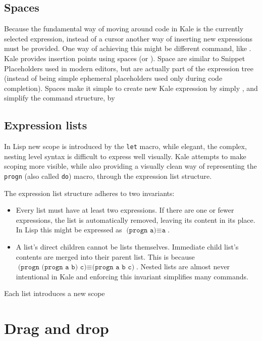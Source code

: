 \subsection{Spaces}
\label{expr:blank}
Because the fundamental way of moving around code in Kale is the currently
selected expression, instead of a cursor another way of inserting new
expressions must be provided. One way of achieving this might be different
 command, like . Kale
provides insertion points using spaces (or ).
Space are similar to Snippet Placeholders used in modern editors,
but are actually part of the expression tree (instead of being simple ephemeral
placeholders used only during code completion). Spaces make it simple to create
new Kale expression by simply , and simplify the
command structure, by 

\subsection{Expression lists}
\label{expr:list}
In Lisp new scope is introduced by the \texttt{let} macro, while elegant, the
complex, nesting level syntax is difficult to express well visually. Kale
attempts to make scoping more visible, while also providing a visually clean
way of representing the \texttt{progn} (also called \texttt{do}) macro,
through the expression list structure.

The expression list structure adheres to two invariants:
\begin{itemize}[noitemsep]
	\item Every list must have at least two expressions. If there are one or
	fewer expressions, the list is automatically removed, leaving its content
	in its place. In Lisp this might be expressed as
	$\texttt{(progn a)} \equiv \texttt{a}$.
	\item A list's direct children cannot be lists themselves. Immediate child
	list's contents are merged into their parent list. This is because
	$\texttt{(progn (progn a b) c)} \equiv \texttt{(progn a b c)}$.
	Nested lists are almost never intentional in Kale and enforcing this
	invariant simplifies many commands.
\end{itemize}

Each list introduces a new scope 

\clearpage
\section{Drag and drop}

